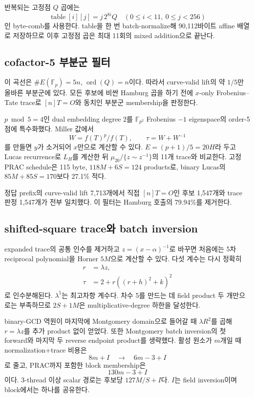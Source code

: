 \documentclass[10pt,a4paper]{article}
\begin{document}
반복되는 고정점 \(Q\) 곱에는
\[
 \operatorname{table}[i][j]=j\,2^{8i}Q
 \quad(0\le i<11,\ 0\le j<256)
\]
인 byte-comb를 사용한다. table을 한 번 batch-normalize해
90,112바이트 affine 배열로 저장하므로 이후 고정점 곱은 최대 11회의
mixed addition으로 끝난다.

\subsection{cofactor-5 부분군 필터}

이 곡선은 \(\#E(\mathbb F_p)=5n\), \(\operatorname{ord}(Q)=n\)이다.
따라서 curve-valid lift의 약 \(1/5\)만 올바른 부분군에 있다. 모든 후보에
비싼 Hamburg 곱을 하기 전에 \(x\)-only Frobenius--Tate trace로
\([n]T=O\)와 동치인 부분군 membership을 판정한다.

\(p\bmod5=4\)인 dual embedding degree 2를
\(\mathbb F_{p^2}\) Frobenius \(-1\) eigenspace의 order-5 점에
특수화했다. Miller 값에서
\[
 W=f(T)^p/f(T),\qquad \tau=W+W^{-1}
\]
를 만들면 \(y\)가 소거되어 \(x\)만으로 계산할 수 있다.
\(E=(p+1)/5=20H\)라 두고 Lucas recurrence로 \(L_H\)를 계산한 뒤
\(\mu_{20}/\{z\sim z^{-1}\}\)의 11개 trace와 비교한다.
고정 PRAC schedule은 115 byte, \(118M+6S=124\) products로,
binary Lucas의 \(85M+85S=170\)보다 27.1\% 적다.

정답 prefix의 curve-valid lift 7,713개에서 직접 \([n]T=O\)인 후보
1,547개와 trace 판정 1,547개가 전부 일치했다. 이 필터는 Hamburg 호출의
79.94\%를 제거한다.

\subsection{shifted-square trace와 batch inversion}

expanded trace의 공통 인수를 제거하고 \(z=(x-\alpha)^{-1}\)로 바꾸면
처음에는 5차 reciprocal polynomial을 Horner \(5M\)으로 계산할 수 있다.
다섯 계수는 다시 정확히
\[
\begin{aligned}
r&=\lambda z,\\
\tau&=2+r((r+h)^2+k)^2
\end{aligned}
\]
로 인수분해된다. \(\lambda^5\)는 최고차항 계수다. 차수 5를 만드는 데
field product 두 개만으로는 부족하므로 \(2S+1M\)은
multiplicative-degree 하한을 달성한다.

binary-GCD 역원이 마지막에 Montgomery domain으로 들어갈 때
\(\lambda R^2\)를 곱해 \(r=\lambda z\)를 추가 product 없이 얻었다.
또한 Montgomery batch inversion의 첫 forward와 마지막 두 reverse
endpoint product를 생략했다. 활성 원소가 \(m\)개일 때
normalization+trace 비용은
\[
  8m+I\quad\longrightarrow\quad 6m-3+I
\]
로 줄고, PRAC까지 포함한 block membership은
\[
  130m-3+I
\]
이다. 3-thread 이상 scalar 경로는 후보당 \(127M/S+I\)다.
\(I\)는 field inversion이며 block에서는 하나를 공유한다.
\end{document}
